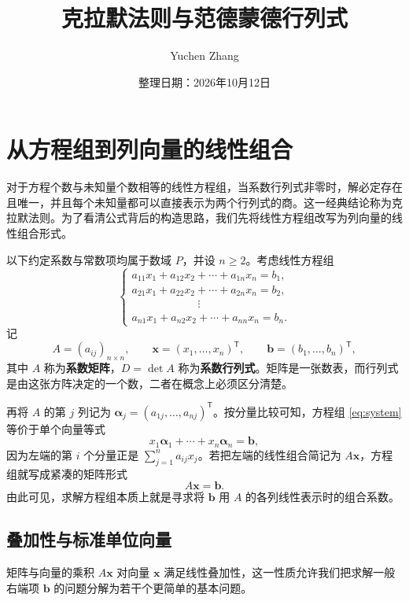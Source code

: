 \documentclass[UTF8, fontset=fandol, a4paper, 12pt]{ctexart}
\title{克拉默法则与范德蒙德行列式}
\author{Yuchen Zhang}
\date{整理日期：2026年10月12日}
\makeatletter
\theoremstyle{definition}
\renewcommand{\maketitle}{%
  \begin{center}
    {\LARGE\bfseries \@title\par}\vspace{0.6em}
    \@author\par\vspace{0.2em}
    {\small \@date\par}
  \end{center}
}
\makeatother
\begin{document}
\maketitle

\section{从方程组到列向量的线性组合}

对于方程个数与未知量个数相等的线性方程组，当系数行列式非零时，解必定存在且唯一，并且每个未知量都可以直接表示为两个行列式的商。这一经典结论称为克拉默法则。为了看清公式背后的构造思路，我们先将线性方程组改写为列向量的线性组合形式。

以下约定系数与常数项均属于数域 $P$，并设 $n\ge2$。考虑线性方程组
\begin{equation}\label{eq:system}
 \begin{cases}
 a_{11}x_1+a_{12}x_2+\cdots+a_{1n}x_n=b_1,\\
 a_{21}x_1+a_{22}x_2+\cdots+a_{2n}x_n=b_2,\\
 \hspace{6em}\vdots\\
 a_{n1}x_1+a_{n2}x_2+\cdots+a_{nn}x_n=b_n.
 \end{cases}
\end{equation}
记
\[
 A=(a_{ij})_{n\times n},\qquad
 \boldsymbol x=(x_1,\ldots,x_n)^{\mathsf T},\qquad
 \boldsymbol b=(b_1,\ldots,b_n)^{\mathsf T},
\]
其中 $A$ 称为\textbf{系数矩阵}，$D=\det A$ 称为\textbf{系数行列式}。矩阵是一张数表，而行列式是由这张方阵决定的一个数，二者在概念上必须区分清楚。

再将 $A$ 的第 $j$ 列记为 $\boldsymbol\alpha_j=(a_{1j},\ldots,a_{nj})^{\mathsf T}$。按分量比较可知，方程组 \eqref{eq:system} 等价于单个向量等式
\begin{equation}\label{eq:column}
 x_1\boldsymbol\alpha_1+\cdots+x_n\boldsymbol\alpha_n=\boldsymbol b,
\end{equation}
因为左端的第 $i$ 个分量正是 $\sum_{j=1}^n a_{ij}x_j$。若把左端的线性组合简记为 $A\boldsymbol x$，方程组就写成紧凑的矩阵形式
\[
 A\boldsymbol x=\boldsymbol b.
\]
由此可见，求解方程组本质上就是寻求将 $\boldsymbol b$ 用 $A$ 的各列线性表示时的组合系数。

\subsection{叠加性与标准单位向量}

矩阵与向量的乘积 $A\boldsymbol x$ 对向量 $\boldsymbol x$ 满足线性叠加性，这一性质允许我们把求解一般右端项 $\boldsymbol b$ 的问题分解为若干个更简单的基本问题。
\end{document}
